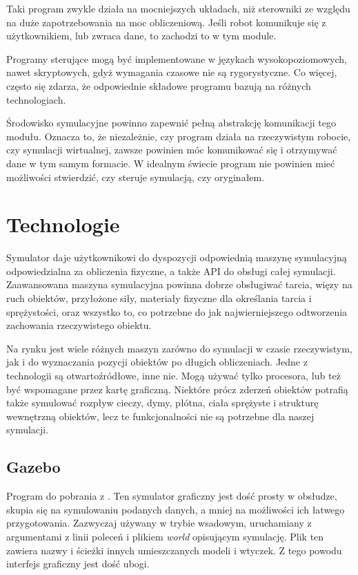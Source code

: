 Taki program zwykle działa na mocniejszych układach, niż sterowniki ze względu na duże zapotrzebowania na moc obliczeniową.
Jeśli robot komunikuje się z użytkownikiem, lub zwraca dane, to zachodzi to w tym module. 

Programy sterujące mogą być implementowane w językach wysokopoziomowych, nawet skryptowych, gdyż wymagania czasowe nie są rygorystyczne.
Co więcej, często się zdarza, że odpowiednie składowe programu bazują na różnych technologiach.

Środowisko symulacyjne powinno zapewnić pełną abstrakcję komunikacji tego modułu.
Oznacza to, że niezależnie, czy program działa na rzeczywistym robocie, czy symulacji wirtualnej, zawsze powinien móc komunikować się i otrzymywać dane w tym samym formacie.
W idealnym świecie program nie powinien mieć możliwości stwierdzić, czy steruje symulacją, czy oryginałem.

\section{Technologie}
Symulator daje użytkownikowi do dyspozycji odpowiednią maszynę symulacyjną odpowiedzialna za obliczenia fizyczne, a także API do obsługi całej symulacji.
Zaawansowana maszyna symulacyjna powinna dobrze obsługiwać tarcia, więzy na ruch obiektów, przyłożone siły, materiały fizyczne dla określania tarcia i sprężystości, 
oraz wszystko to, co potrzebne do jak najwierniejszego odtworzenia zachowania rzeczywistego obiektu.

Na rynku jest wiele różnych maszyn zarówno do symulacji w czasie rzeczywistym, jak i do wyznaczania pozycji obiektów po długich obliczeniach.
Jedne z technologii są otwartoźródłowe, inne nie. Mogą używać tylko procesora, lub też być wspomagane przez kartę graficzną.
Niektóre prócz zderzeń obiektów potrafią także symulować rozpływ cieczy, dymy, płótna, ciała sprężyste i strukturę wewnętrzną obiektów, lecz te funkcjonalności nie są potrzebne dla naszej symulacji.

\subsection{Gazebo}
Program do pobrania z \cite{gazebo_website}. Ten symulator graficzny jest dość prosty w obsłudze, skupia się na symulowaniu podanych danych, a mniej na możliwości ich łatwego przygotowania.
Zazwyczaj używany w trybie wsadowym, uruchamiany z argumentami z linii poleceń i plikiem \emph{world} opisującym symulację.
Plik ten zawiera nazwy i ścieżki innych umieszczanych modeli i wtyczek.
Z tego powodu interfejs graficzny jest dość ubogi.


